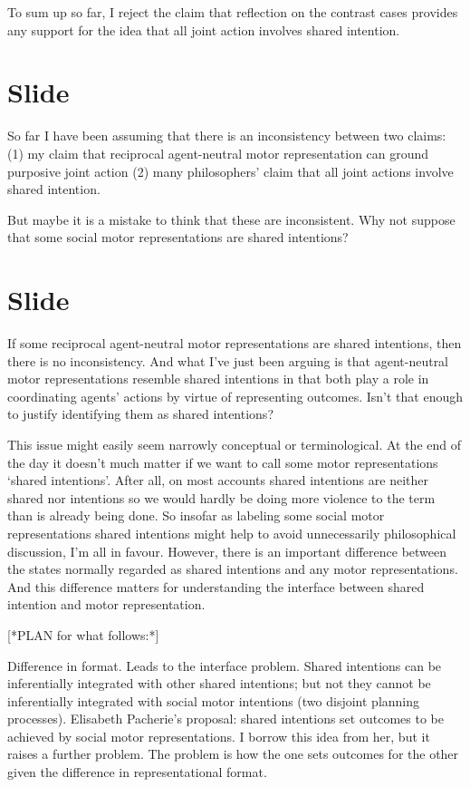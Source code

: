 \documentclass[12pt,\papersize]{extarticle}
\begin{document}
To sum up so far, I reject the claim that reflection on the contrast cases provides any support for the idea that all joint action involves shared intention.



\section{Slide}
So far I have been assuming that there is an inconsistency between two claims:
(1) my claim that reciprocal  agent-neutral motor representation can ground purposive joint action
(2) many philosophers’ claim that all joint actions involve shared intention.

But maybe it is a mistake to think that these are inconsistent.
Why not suppose that some social motor representations are  shared intentions?




\section{Slide}
If some reciprocal agent-neutral motor representations are shared intentions, then there is no inconsistency.
And what I’ve just been arguing is that agent-neutral motor representations resemble shared intentions in that both play a role in coordinating agents’ actions by virtue of representing outcomes.  Isn’t that enough to justify identifying them as shared intentions?

This issue might easily seem narrowly conceptual or terminological.  
At the end of the day it doesn’t much matter if we want to call some motor representations ‘shared intentions’.  
After all, on most accounts shared intentions are neither shared nor intentions so we would hardly be doing more violence to the term than is already being done.  
So insofar as labeling some social motor representations shared intentions might help to avoid unnecessarily philosophical discussion, I’m all in favour.
However, there is an important difference between the states normally regarded as  shared intentions and any motor representations.
And this difference matters for understanding the interface between shared intention and motor representation.


[*PLAN for what follows:*]

Difference in format.
Leads to the interface problem.  
Shared intentions can be inferentially integrated with other shared intentions; but not they cannot be inferentially integrated with social motor intentions (two disjoint planning processes).  
Elisabeth Pacherie’s proposal: shared intentions set outcomes to be achieved by social motor representations.  
I borrow this idea from her, but it raises a further problem.
The problem is how the one sets outcomes for the other given the difference in representational format.
\end{document}
